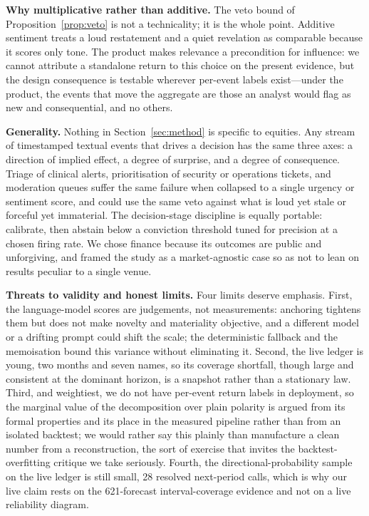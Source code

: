 \documentclass{elektr}
\begin{document}
\textbf{Why multiplicative rather than additive.} The veto bound of Proposition~\ref{prop:veto} is not a technicality; it is the whole point. Additive sentiment treats a loud restatement and a quiet revelation as comparable because it scores only tone. The product makes relevance a precondition for influence: we cannot attribute a standalone return to this choice on the present evidence, but the design consequence is testable wherever per-event labels exist---under the product, the events that move the aggregate are those an analyst would flag as new and consequential, and no others.

\textbf{Generality.} Nothing in Section~\ref{sec:method} is specific to equities. Any stream of timestamped textual events that drives a decision has the same three axes: a direction of implied effect, a degree of surprise, and a degree of consequence. Triage of clinical alerts, prioritisation of security or operations tickets, and moderation queues suffer the same failure when collapsed to a single urgency or sentiment score, and could use the same veto against what is loud yet stale or forceful yet immaterial. The decision-stage discipline is equally portable: calibrate, then abstain below a conviction threshold tuned for precision at a chosen firing rate. We chose finance because its outcomes are public and unforgiving, and framed the study as a market-agnostic case so as not to lean on results peculiar to a single venue.

\textbf{Threats to validity and honest limits.} Four limits deserve emphasis. First, the language-model scores are judgements, not measurements: anchoring tightens them but does not make novelty and materiality objective, and a different model or a drifting prompt could shift the scale; the deterministic fallback and the memoisation bound this variance without eliminating it. Second, the live ledger is young, two months and seven names, so its coverage shortfall, though large and consistent at the dominant horizon, is a snapshot rather than a stationary law. Third, and weightiest, we do not have per-event return labels in deployment, so the marginal value of the decomposition over plain polarity is argued from its formal properties and its place in the measured pipeline rather than from an isolated backtest; we would rather say this plainly than manufacture a clean number from a reconstruction, the sort of exercise that invites the backtest-overfitting critique \cite{bailey2017,harvey2016} we take seriously. Fourth, the directional-probability sample on the live ledger is still small, 28 resolved next-period calls, which is why our live claim rests on the 621-forecast interval-coverage evidence and not on a live reliability diagram.
\end{document}

